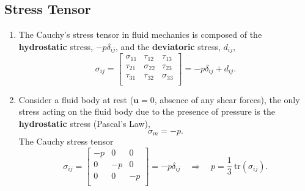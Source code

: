 \documentclass[a4paper]{article}
\begin{document}
\subsection{Stress Tensor}
\begin{enumerate}
    \item The Cauchy's stress tensor in fluid mechanics is composed of the \textbf{hydrostatic} stress, $-p\delta_{ij}$, and the \textbf{deviatoric} stress, $d_{ij}$,
    \[
    \sigma_{ij} = 
        \begin{bmatrix}
        \sigma_{11} &   \tau_{12}   & \tau_{13} \\
        \tau_{21} &   \sigma_{22}   & \tau_{23} \\
        \tau_{31} &   \tau_{32}   & \sigma_{33} \\
        \end{bmatrix}
        = -p\delta_{ij} + d_{ij}.
    \]
    \item Consider a fluid body at rest ($\mathbf{u}=0$, absence of any shear forces), the only stress acting on the fluid body due to the presence of pressure is the \textbf{hydrostatic} stress (Pascal's Law),
    \[
        \sigma_m = -p.
    \]
    The Cauchy stress tensor 
    \[
        \sigma_{ij} = 
        \begin{bmatrix}
        -p &   0   & 0 \\
        0 &   -p   & 0 \\
        0 &   0   & -p \\
        \end{bmatrix} = -p\delta_{ij} \quad \Rightarrow \quad p = \frac{1}{3} \ \mathrm{tr}(\sigma_{ij}).
    \]
    

\end{enumerate}
\end{document}
